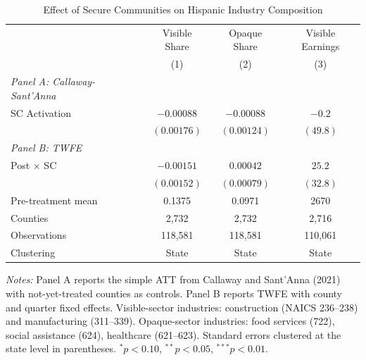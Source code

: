 \begin{table}[htbp]
\centering
\begin{threeparttable}
\caption{Effect of Secure Communities on Hispanic Industry Composition}
\label{tab:main}
\begin{tabular}{lccc}
\toprule
 & Visible Share & Opaque Share & Visible Earnings \\
 & (1) & (2) & (3) \\
\midrule
\textit{Panel A: Callaway-Sant'Anna} & & & \\
SC Activation & $-0.00088$ & $-0.00088$ & $-0.2$ \\
 & $(0.00176)$ & $(0.00124)$ & $(49.8)$ \\
\addlinespace
\textit{Panel B: TWFE} & & & \\
Post $\times$ SC & $-0.00151$ & $0.00042$ & $25.2$ \\
 & $(0.00152)$ & $(0.00079)$ & $(32.8)$ \\
\addlinespace
Pre-treatment mean & 0.1375 & 0.0971 & 2670 \\
Counties & 2,732 & 2,732 & 2,716 \\
Observations & 118,581 & 118,581 & 110,061 \\
Clustering & State & State & State \\
\bottomrule
\end{tabular}
\begin{tablenotes}[flushleft]
\small
\item \textit{Notes:} Panel A reports the simple ATT from Callaway and Sant'Anna (2021) with not-yet-treated counties as controls. Panel B reports TWFE with county and quarter fixed effects. Visible-sector industries: construction (NAICS 236--238) and manufacturing (311--339). Opaque-sector industries: food services (722), social assistance (624), healthcare (621--623). Standard errors clustered at the state level in parentheses. $^{*}p<0.10$, $^{**}p<0.05$, $^{***}p<0.01$.
\end{tablenotes}
\end{threeparttable}
\end{table}
